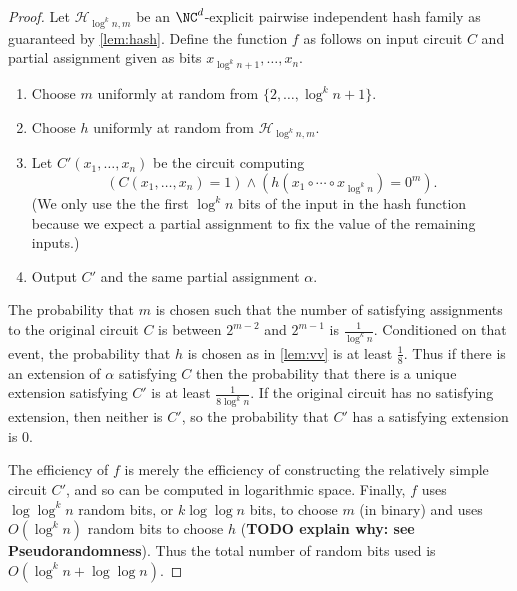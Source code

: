 \documentclass{article}
\begin{document}
\begin{proof}
  Let $\mathcal{H}_{\log^k n, m}$ be an $\NC^d$-explicit pairwise independent hash family as guaranteed by \autoref{lem:hash}.
  Define the function $f$ as follows on input circuit $C$ and partial assignment given as bits $x_{\log^k n + 1}, \dotsc, x_n$.
  \begin{enumerate}
  \item Choose $m$ uniformly at random from $\{2, \dotsc, \log^k n + 1\}$.
  \item Choose $h$ uniformly at random from $\mathcal{H}_{\log^k n, m}$.
  \item
    Let $C'(x_1, \dotsc, x_n)$ be the circuit computing
    \begin{equation*}
      (C(x_1, \dotsc, x_n) = 1) \land (h(x_1 \circ \dotsb \circ x_{\log^k n}) = 0^m).
    \end{equation*}
    (We only use the the first $\log^k n$ bits of the input in the hash function because we expect a partial assignment to fix the value of the remaining inputs.)
  \item Output $C'$ and the same partial assignment $\alpha$.
  \end{enumerate}
  The probability that $m$ is chosen such that the number of satisfying assignments to the original circuit $C$ is between $2^{m - 2}$ and $2^{m - 1}$ is $\frac{1}{\log^k n}$.
  Conditioned on that event, the probability that $h$ is chosen as in \autoref{lem:vv} is at least $\frac{1}{8}$.
  Thus if there is an extension of $\alpha$ satisfying $C$ then the probability that there is a unique extension satisfying $C'$ is at least $\frac{1}{8 \log^k n}$.
  If the original circuit has no satisfying extension, then neither is $C'$, so the probability that $C'$ has a satisfying extension is 0.

  The efficiency of $f$ is merely the efficiency of constructing the relatively simple circuit $C'$, and so can be computed in logarithmic space.
  Finally, $f$ uses $\log \log^k n$ random bits, or $k \log \log n$ bits, to choose $m$ (in binary) and uses $O(\log^k n)$ random bits to choose $h$ (\textbf{TODO explain why: see Pseudorandomness}).
  Thus the total number of random bits used is $O(\log^k n + \log \log n)$.
\end{proof}
\end{document}
